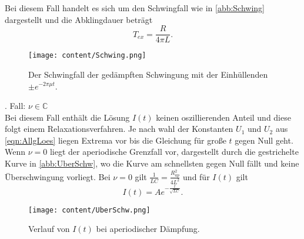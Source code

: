 Bei diesem Fall handelt es sich um den Schwingfall wie in \autoref{abb:Schwing} dargestellt und die Abklingdauer beträgt
\begin{equation*}
    T_{ex} = \frac{R}{4\pi L}.
\end{equation*}
\begin{figure}[H]
    \centering
    \texttt{[image: content/Schwing.png]}
    \caption{Der Schwingfall der gedämpften Schwingung mit der Einhüllenden $\pm e^{-2\pi\mu t}$. \cite{sample}}
    \label{abb:Schwing}
\end{figure}
. Fall: $\nu\in\mathbb{C}$\\
Bei diesem Fall enthält die Lösung $I(t)$ keinen oszillierenden Anteil und diese folgt einem Relaxationsverfahren.
Je nach wahl der Konstanten $U_1$ und $U_2$ aus \eqref{eqn:AllgLoes} liegen Extrema vor bis die Gleichung für große
$t$ gegen Null geht. Wenn $\nu = 0$ liegt der aperiodische Grenzfall vor, dargestellt durch die gestrichelte Kurve in
\autoref{abb:UberSchw}, wo die Kurve am schnellsten gegen Null fällt und keine Überschwingung vorliegt. Bei $\nu = 0$ gilt
$\frac{1}{LC} = \frac{R^2_{ap}}{4L^2}$ und für $I(t)$ gilt
\begin{equation}
    I(t) = Ae^{-\frac{t}{\sqrt{LC}}}.
\end{equation}
\begin{figure}[H]
    \centering
    \texttt{[image: content/UberSchw.png]}
    \caption{Verlauf von $I(t)$ bei aperiodischer Dämpfung. \cite{sample}}
    \label{abb:UberSchw}
\end{figure}
